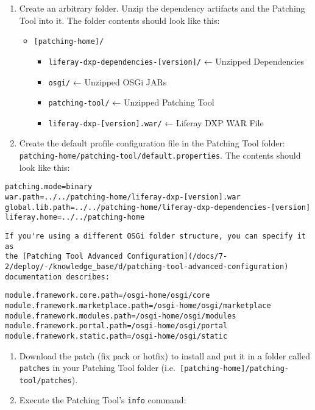 \begin{enumerate}
\def\labelenumi{\arabic{enumi}.}
\item
  Create an arbitrary folder. Unzip the dependency artifacts and the
  Patching Tool into it. The folder contents should look like this:

  \begin{itemize}
  \tightlist
  \item
    \texttt{{[}patching-home{]}/}

    \begin{itemize}
    \tightlist
    \item
      \texttt{liferay-dxp-dependencies-{[}version{]}/} ← Unzipped
      Dependencies
    \item
      \texttt{osgi/} ← Unzipped OSGi JARs
    \item
      \texttt{patching-tool/} ← Unzipped Patching Tool
    \item
      \texttt{liferay-dxp-{[}version{]}.war/} ← Liferay DXP WAR File
    \end{itemize}
  \end{itemize}
\item
  Create the default profile configuration file in the Patching Tool
  folder: \texttt{patching-home/patching-tool/default.properties}. The
  contents should look like this:
\end{enumerate}

\begin{verbatim}
patching.mode=binary
war.path=../../patching-home/liferay-dxp-[version].war
global.lib.path=../../patching-home/liferay-dxp-dependencies-[version]
liferay.home=../../patching-home
\end{verbatim}

\begin{verbatim}
If you're using a different OSGi folder structure, you can specify it as
the [Patching Tool Advanced Configuration](/docs/7-2/deploy/-/knowledge_base/d/patching-tool-advanced-configuration)
documentation describes: 
\end{verbatim}

\begin{verbatim}
module.framework.core.path=/osgi-home/osgi/core
module.framework.marketplace.path=/osgi-home/osgi/marketplace
module.framework.modules.path=/osgi-home/osgi/modules
module.framework.portal.path=/osgi-home/osgi/portal
module.framework.static.path=/osgi-home/osgi/static 
\end{verbatim}

\begin{enumerate}
\def\labelenumi{\arabic{enumi}.}
\setcounter{enumi}{2}
\item
  Download the patch (fix pack or hotfix) to install and put it in a
  folder called \texttt{patches} in your Patching Tool folder
  (i.e.~\texttt{{[}patching-home{]}/patching-tool/patches}).
\item
  Execute the Patching Tool's \texttt{info} command:
\end{enumerate}

